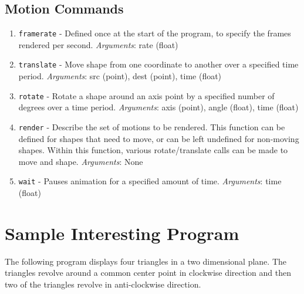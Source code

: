 \documentclass[letterpaper,12pt]{article}
\begin{document}
\subsection*{Motion Commands}
\begin{enumerate}
\itemsep0em
\item \texttt{framerate} - Defined once at the start of the program, to specify the frames rendered per second.
\textit{Arguments}: rate (float)
\item \texttt{translate} - Move shape from one coordinate to another over a specified time period.
\textit{Arguments}: src (point), dest (point), time (float)
\item \texttt{rotate} - Rotate a shape around an axis point by a specified number of degrees over a time period.
\textit{Arguments}: axis (point), angle (float), time (float)
\item \texttt{render} - Describe the set of motions to be rendered. This function can be defined for shapes that need to move, or can be left undefined for non-moving shapes. Within this function, various rotate/translate calls can be made to move and shape.
\textit{Arguments}: None
\item \texttt{wait} - Pauses animation for a specified amount of time.
\textit{Arguments}: time (float)
\end{enumerate}

\section*{Sample Interesting Program}
The following program displays four triangles in a two dimensional plane. The triangles revolve around a common center point in clockwise direction and then two of the triangles revolve in anti-clockwise direction.
\end{document}
